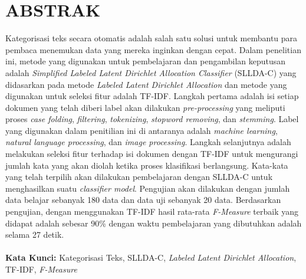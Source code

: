 \chapter*{ABSTRAK}
\noindent
Kategorisasi teks secara otomatis adalah salah satu solusi untuk membantu para pembaca menemukan data yang mereka inginkan dengan cepat. Dalam penelitian ini, metode yang digunakan untuk pembelajaran dan pengambilan keputusan adalah {\itshape Simplified Labeled Latent Dirichlet Allocation Classifier} (SLLDA-C) yang didasarkan pada metode {\itshape Labeled Latent Dirichlet Allocation} dan metode yang digunakan untuk seleksi fitur adalah TF-IDF. Langkah pertama adalah isi setiap dokumen yang telah diberi label akan dilakukan {\itshape pre-processing} yang meliputi proses {\itshape case folding}, {\itshape filtering}, {\itshape tokenizing}, {\itshape stopword removing}, dan {\itshape stemming}. Label yang digunakan dalam penitilian ini di antaranya adalah {\itshape machine learning}, {\itshape natural language processing}, dan {\itshape image processing}. Langkah selanjutnya adalah melakukan seleksi fitur terhadap isi dokumen dengan TF-IDF untuk mengurangi jumlah kata yang akan diolah ketika proses klasifikasi berlangsung. Kata-kata yang telah terpilih akan dilakukan pembelajaran dengan SLLDA-C untuk menghasilkan suatu {\itshape classifier model}. Pengujian akan dilakukan dengan jumlah data belajar sebanyak 180 data dan data uji sebanyak 20 data. Berdasarkan pengujian, dengan menggunakan TF-IDF hasil rata-rata {\itshape F-Measure} terbaik yang didapat adalah sebesar 90\% dengan waktu pembelajaran yang dibutuhkan adalah selama 27 detik.
\\\\
\noindent \textbf{Kata Kunci:} Kategorisasi Teks, SLLDA-C, {\itshape Labeled Latent Dirichlet Allocation}, TF-IDF, {\itshape F-Measure}
\\